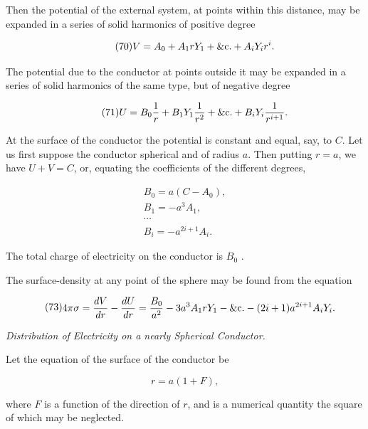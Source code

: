 \documentclass[11pt,a4paper]{article}
\begin{document}
Then the potential of the external system, at points within this distance, may be expanded in a series of solid harmonics of positive degree

\begin{equation}\tag{70}
V=A_0+A_1rY_1+\hbox{\&c.}+A_iY_ir^i.
\end{equation}

The potential due to the conductor at points outside it may be expanded in a series of solid harmonics of the same type, but of negative degree

\begin{equation}\tag{71}
U=B_0\frac{1}{r}+B_1Y_1\frac{1}{r^2}+\hbox{\&c.}+B_iY_i\frac{1}{r^{i+1}}.
\end{equation}

At the surface of the conductor the potential is constant and equal, say, to $C$. Let us first suppose the conductor spherical and of radius $a$. Then putting $r=a$, we have $U+V=C$, or, equating the coefficients of the different degrees,

\begin{equation}\tag{72}
\begin{gathered}
B_0=a(C-A_0),\\
B_1=-a^3A_1,\\
\cdots\\
B_i=-a^{2i+1}A_i.
\end{gathered}
\end{equation}

The total charge of electricity on the conductor is  $B_0$ .

The surface-density at any point of the sphere may be found from the equation

\begin{equation}\tag{73}
\begin{split}
4 \pi \sigma = \frac{dV}{dr} - \frac{dU}{dr}
&=\frac{B_0}{a^2}-3a^3A_1rY_1-\hbox{\&c.}-(2i+1)a^{2i+1}A_iY_i.
\end{split}
\end{equation}

{\centering\itshape Distribution of Electricity on a nearly Spherical Conductor.\par}

Let the equation of the surface of the conductor be

\begin{equation}\tag{74}
r=a(1+F),
\end{equation}

\setcounter{footnote}{0}
where $F$ is a function of the direction of $r$, and is a numerical quantity the square of which may be neglected.
\end{document}

